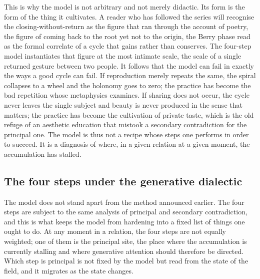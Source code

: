 
This is why the model is not arbitrary and not merely didactic. Its form is the form of the thing it cultivates. A reader who has followed the series will recognise the closing-without-return as the figure that ran through the account of poetry, the figure of coming back to the root yet not to the origin, the Berry phase read as the formal correlate of a cycle that gains rather than conserves. The four-step model instantiates that figure at the most intimate scale, the scale of a single returned gesture between two people. It follows that the model can fail in exactly the ways a good cycle can fail. If reproduction merely repeats the same, the spiral collapses to a wheel and the holonomy goes to zero; the practice has become the bad repetition whose metaphysics  examines. If sharing does not occur, the cycle never leaves the single subject and beauty is never produced in the sense that matters; the practice has become the cultivation of private taste, which is the old refuge of an aesthetic education that mistook a secondary contradiction for the principal one. The model is thus not a recipe whose steps one performs in order to succeed. It is a diagnosis of where, in a given relation at a given moment, the accumulation has stalled.

\subsection{The four steps under the generative dialectic}
\label{p22:sub:four-dialectic}

The model does not stand apart from the method announced earlier. The four steps are subject to the same analysis of principal and secondary contradiction, and this is what keeps the model from hardening into a fixed list of things one ought to do. At any moment in a relation, the four steps are not equally weighted; one of them is the principal site, the place where the accumulation is currently stalling and where generative attention should therefore be directed. Which step is principal is not fixed by the model but read from the state of the field, and it migrates as the state changes.

